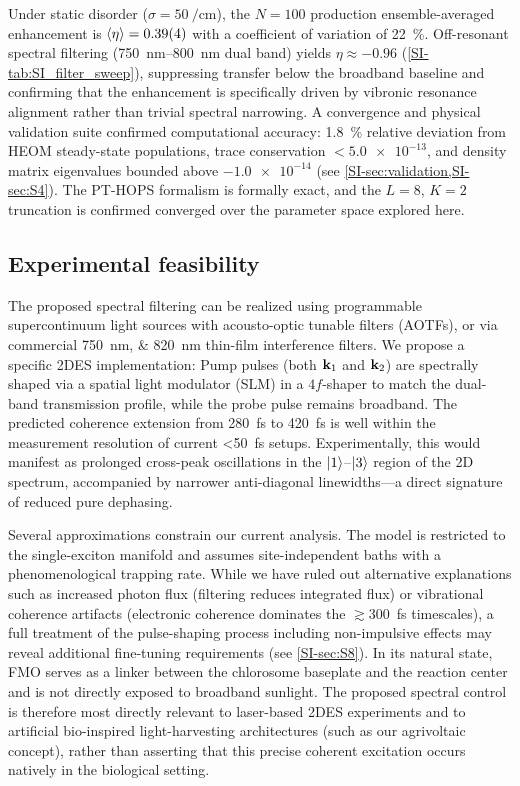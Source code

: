 \documentclass[journal=jpcl,manuscript=letter]{achemso}
\begin{document}
Under static disorder ($\sigma = \SI{50}{\per\centi\meter}$), the $N=100$ production ensemble-averaged enhancement is $\expval{\eta} = \num{0.39(4)}$ with a coefficient of variation of \SI{22}{\percent}. Off-resonant spectral filtering (\SIrange{750}{800}{\nano\meter} dual band) yields $\eta \approx \num{-0.96}$ (\cref{SI-tab:SI_filter_sweep}), suppressing transfer below the broadband baseline and confirming that the enhancement is specifically driven by vibronic resonance alignment rather than trivial spectral narrowing. A convergence and physical validation suite confirmed computational accuracy: \SI{1.8}{\percent} relative deviation from HEOM steady-state populations, trace conservation $< \num{5.0e-13}$, and density matrix eigenvalues bounded above $\num{-1.0e-14}$ (see \cref{SI-sec:validation,SI-sec:S4}). The PT-HOPS formalism is formally exact, and the $L=8$, $K=2$ truncation is confirmed converged over the parameter space explored here.

\subsection*{Experimental feasibility}

The proposed spectral filtering can be realized using programmable supercontinuum light sources with acousto-optic tunable filters (AOTFs),\cite{Gunthardt2023} or via commercial \SIlist{750;820}{\nano\meter} thin-film interference filters. We propose a specific 2DES implementation:\cite{Sebastian2024} Pump pulses (both $\vb{k}_1$ and $\vb{k}_2$) are spectrally shaped via a spatial light modulator (SLM) in a $4f$-shaper to match the dual-band transmission profile, while the probe pulse remains broadband.
The predicted coherence extension from \SI{280}{\femto\second} to \SI{420}{\femto\second} is well within the measurement resolution of current \SI{<50}{\femto\second} setups.\cite{Engel2007} Experimentally, this would manifest as prolonged cross-peak oscillations in the $\ket{1}$--$\ket{3}$ region of the 2D spectrum, accompanied by narrower anti-diagonal linewidths—a direct signature of reduced pure dephasing. 

Several approximations constrain our current analysis. The model is restricted to the single-exciton manifold and assumes site-independent baths with a phenomenological trapping rate. While we have ruled out alternative explanations such as increased photon flux (filtering reduces integrated flux) or vibrational coherence artifacts (electronic coherence dominates the $\gtrsim$\SI{300}{\femto\second} timescales), a full treatment of the pulse-shaping process including non-impulsive effects may reveal additional fine-tuning requirements (see \cref{SI-sec:S8}). In its natural state, FMO serves as a linker between the chlorosome baseplate and the reaction center and is not directly exposed to broadband sunlight.\cite{Blankenship2011} The proposed spectral control is therefore most directly relevant to laser-based 2DES experiments and to artificial bio-inspired light-harvesting architectures (such as our agrivoltaic concept), rather than asserting that this precise coherent excitation occurs natively in the biological setting.
\end{document}
